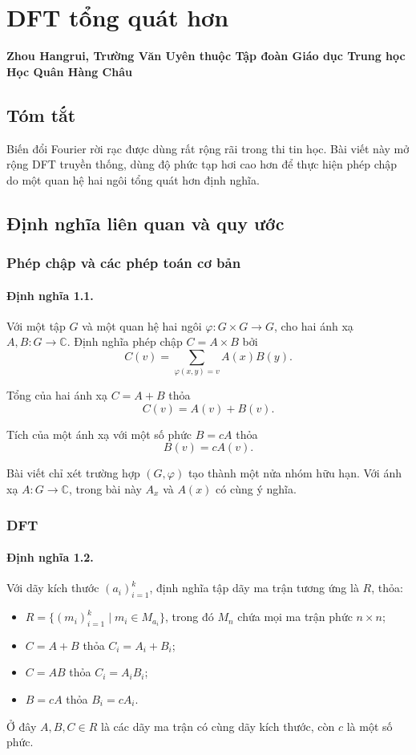 \documentclass[11pt]{article}
\begin{document}
\section{DFT tổng quát hơn}

\begin{center}
\textbf{Zhou Hangrui, Trường Văn Uyên thuộc Tập đoàn Giáo dục Trung học Học
Quân Hàng Châu}
\end{center}

\subsection*{Tóm tắt}

Biến đổi Fourier rời rạc được dùng rất rộng rãi trong thi tin học. Bài viết này
mở rộng DFT truyền thống, dùng độ phức tạp hơi cao hơn để thực hiện phép chập
do một quan hệ hai ngôi tổng quát hơn định nghĩa.

\subsection{Định nghĩa liên quan và quy ước}

\subsubsection{Phép chập và các phép toán cơ bản}

\paragraph{Định nghĩa 1.1.}
Với một tập $G$ và một quan hệ hai ngôi $\varphi:G\times G\to G$, cho hai ánh xạ
$A,B:G\to \mathbb C$. Định nghĩa phép chập $C=A\times B$ bởi
\[
  C(v)=\sum_{\varphi(x,y)=v} A(x)B(y).
\]

Tổng của hai ánh xạ $C=A+B$ thỏa
\[
  C(v)=A(v)+B(v).
\]

Tích của một ánh xạ với một số phức $B=cA$ thỏa
\[
  B(v)=cA(v).
\]

Bài viết chỉ xét trường hợp $(G,\varphi)$ tạo thành một nửa nhóm hữu hạn. Với
ánh xạ $A:G\to\mathbb C$, trong bài này $A_x$ và $A(x)$ có cùng ý nghĩa.

\subsubsection{DFT}

\paragraph{Định nghĩa 1.2.}
Với dãy kích thước $(a_i)_{i=1}^{k}$, định nghĩa tập dãy ma trận tương ứng là
$R$, thỏa:
\begin{itemize}
  \item $R=\{(m_i)_{i=1}^{k}\mid m_i\in M_{a_i}\}$, trong đó $M_n$ chứa mọi ma
  trận phức $n\times n$;
  \item $C=A+B$ thỏa $C_i=A_i+B_i$;
  \item $C=AB$ thỏa $C_i=A_iB_i$;
  \item $B=cA$ thỏa $B_i=cA_i$.
\end{itemize}
Ở đây $A,B,C\in R$ là các dãy ma trận có cùng dãy kích thước, còn $c$ là một số
phức.
\end{document}
